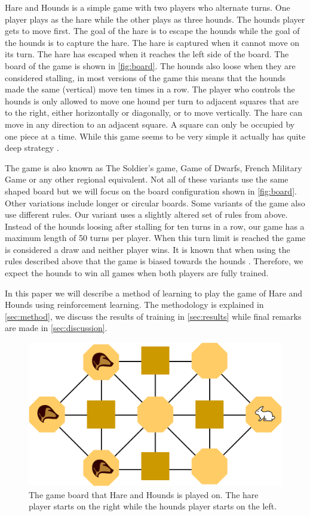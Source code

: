 Hare and Hounds is a simple game with two players who alternate turns. One
player plays as the hare while the other plays as three hounds. The hounds
player gets to move first. The goal of the
hare is to escape the hounds while the goal of the hounds is to capture the
hare. The hare is captured when it cannot move on its turn. The hare has escaped
when it reaches the left side of the board. The board of the game is shown in
\autoref{fig:board}. The hounds also loose when they are considered stalling,
in most versions of the game this means that the hounds made the same
(vertical) move ten times in a row. The player who controls the hounds is only
allowed to move one hound per turn to adjacent squares that are to the right,
either horizontally or diagonally, or to move vertically. The hare can move in
any direction to an adjacent square. A square can only be occupied by one piece
at a time. While this game seems to be very simple it actually has quite deep
strategy \cite{gardner1961second}. 

The game is also known as The Soldier's game, Game of Dwarfs, French
Military Game or any other regional equivalent. Not all of these variants
use the same shaped board but we will focus on the board configuration
shown in \autoref{fig:board}. Other variations include longer or circular
boards.  Some variants of the game also use different rules. Our variant
uses a slightly altered set of rules from above. Instead of the hounds
loosing after stalling for ten turns in a row, our game has a maximum
length of 50 turns per player.  When this turn limit is reached the game is
considered a draw and neither player wins.  It is known that when using the
rules described above that the game is biased towards the
hounds \cite{gardner1961second}. Therefore, we expect the hounds to win all
games when  both players are fully trained. 

In this paper we will describe a method of learning to play the game of Hare
and Hounds using reinforcement learning. The methodology is explained in
\autoref{sec:method}, we discuss the results of training in
\autoref{sec:results} while final remarks are made in \autoref{sec:discussion}.

\begin{figure}[h]
    \centering
    \includegraphics[width=.75\textwidth]{Hare_and_Hounds_board.png}
    \caption{The game board that Hare and Hounds is played on. The hare player
        starts on the right while the hounds player starts on the left.}
    \label{fig:board}
\end{figure}
